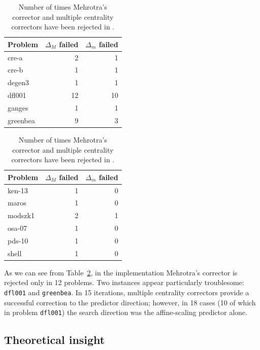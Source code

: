 \begin{table}[ht]
  \centering
  \begin{minipage}[t]{0.45\textwidth}
    \begin{tabular}{|l|r|r|}\hline
      Problem  & $\Delta_M$ failed & $\Delta_m$ failed \\ \hline
      cre-a    &  2  &  1 \\
      cre-b    &  1  &  1 \\
      degen3   &  1  &  1 \\ 
      dfl001   & 12  & 10 \\
      ganges   &  1  &  1 \\
      greenbea &  9  &  3 \\ \hline
    \end{tabular}
  \end{minipage} \hspace{1em}
  \begin{minipage}[t]{0.45\textwidth}
    \begin{tabular}{|l|r|r|}\hline
      Problem  & $\Delta_M$ failed & $\Delta_m$ failed \\ \hline
      ken-13   &  1  &  0 \\
      maros    &  1  &  0 \\
      modszk1  &  2  &  1 \\
      osa-07   &  1  &  0 \\
      pds-10   &  1  &  0 \\
      shell    &  1  &  0 \\ \hline
    \end{tabular}
  \end{minipage}
  \caption{Number of times Mehrotra's corrector and
           multiple centrality correctors have been rejected in \HOPDM.}
  \label{table:MehrotraFailure}
\end{table}

As we can see from Table~\ref{table:MehrotraFailure}, in the
\HOPDM implementation Mehrotra's corrector is rejected only in
12 problems. Two instances appear particularly troublesome:
{\tt dfl001} and {\tt greenbea}.
In 15 iterations, multiple centrality correctors provide a
successful correction to the predictor direction;
however, in 18 cases (10 of which in problem {\tt dfl001})
the search direction was the affine-scaling predictor alone.

%
%
\subsection{Theoretical insight}

